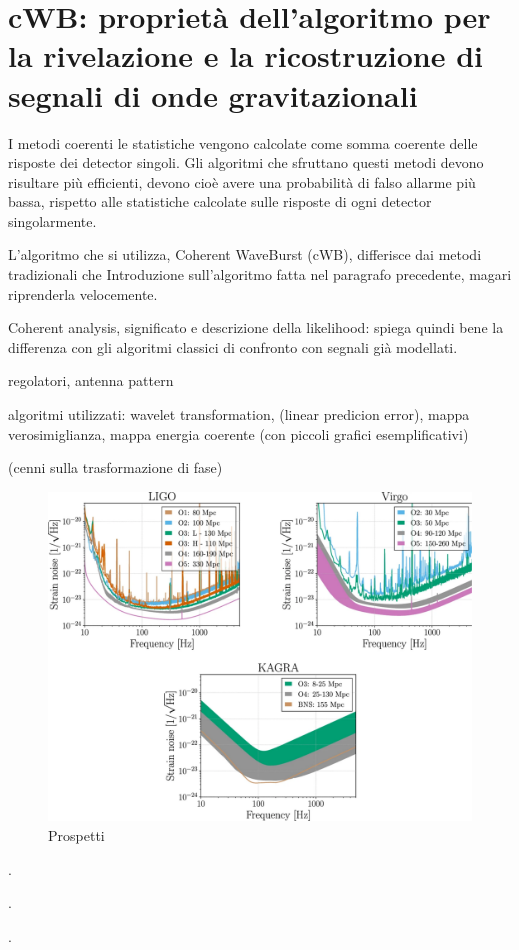 \chapter[cWB]{cWB: proprietà dell'algoritmo per la rivelazione e la ricostruzione di segnali di onde gravitazionali}
\label{chapter:cwb}

I metodi coerenti le statistiche vengono calcolate come somma coerente delle risposte dei detector singoli. Gli algoritmi che sfruttano questi metodi devono risultare più efficienti, devono cioè avere una probabilità di falso allarme più bassa, rispetto alle statistiche calcolate sulle risposte di ogni detector singolarmente.

L'algoritmo che si utilizza, Coherent WaveBurst (cWB), differisce dai metodi tradizionali che 
Introduzione sull'algoritmo fatta nel paragrafo precedente, magari riprenderla velocemente.

Coherent analysis, significato e descrizione della likelihood: spiega quindi bene la differenza con gli algoritmi classici di confronto con segnali già modellati.

regolatori, antenna pattern

algoritmi utilizzati: wavelet transformation, (linear predicion error), mappa verosimiglianza, mappa energia coerente (con piccoli grafici esemplificativi)

(cenni sulla trasformazione di fase)

\begin{center}
	\begin{figure}[ht]
		\centering
		\includegraphics[scale=0.25, angle=0]{figures/Capitolo_3/noiseO4.pdf}
		\setlength{\belowcaptionskip}{-20pt}
		\caption{Prospetti \cite{Abbott_2020a}}
		\label{fig:noiseO4}
	\end{figure}
\end{center}

\lipsum[3]\cite{Abbott_2017a}.

\lipsum[4]\cite{Klimenko_2008}.

\lipsum[6]\cite{Klimenko_2016}.